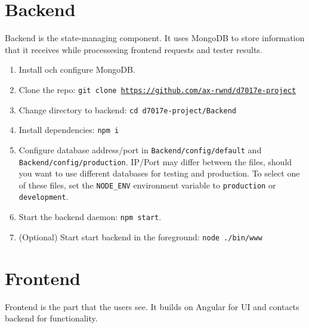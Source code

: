 \section{Backend}
Backend is the state-managing component. It uses MongoDB to store information that it receives while processesing frontend requests and tester results.
\begin{enumerate}
\item Install och configure MongoDB.
\item Clone the repo: \texttt{git clone \url{https://github.com/ax-rwnd/d7017e-project}}
\item Change directory to backend: \texttt{cd d7017e-project/Backend}
\item Install dependencies: \texttt{npm i}
\item Configure database address/port in \texttt{Backend/config/default} and \\
\texttt{Backend/config/production}. IP/Port may differ between the files, should you want to use different databases for testing and production. To select one of these files, set the \texttt{NODE\_ENV} environment variable to \texttt{production} or \texttt{development}.
\item Start the backend daemon: \texttt{npm start}.
\item (Optional) Start start backend in the foreground: \texttt{node ./bin/www}
\end{enumerate}

\section{Frontend}
Frontend is the part that the users see. It builds on Angular for UI and contacts backend for functionality.

